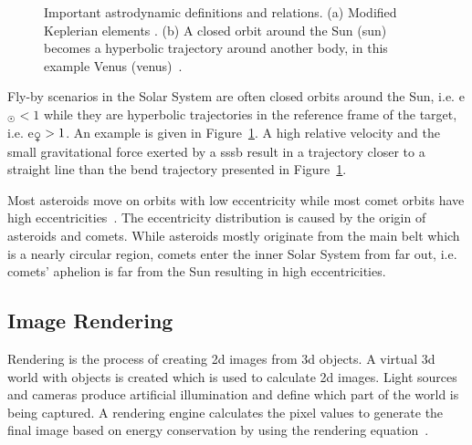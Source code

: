 \begin{figure}[htb]
\begin{subfigure}[b]{0.47\textwidth}
        \caption{}
        \label{fig:hyperbolic_orbit}
    \end{subfigure}
    \label{fig:astrodynamics}
    \caption{Important astrodynamic definitions and relations. (a) Modified Keplerian elements \cite{Commons2019Orbit}. (b) A closed orbit around the Sun (\gls{sun}) becomes a hyperbolic trajectory around another body, in this example Venus (\gls{venus})~\cite{Hintz2015FundamentalsAstrodynamics}.}
\end{figure}

Fly-by scenarios in the Solar System are often closed orbits around the Sun, i.e. \gls{e}$_{\astrosun} < 1$ while they are hyperbolic trajectories in the reference frame of the target, i.e. \gls{e}$_{\venus} > 1$. An example is given in Figure~\ref{fig:hyperbolic_orbit}. A high relative velocity and the small gravitational force exerted by a \gls{sssb} result in a trajectory closer to a straight line than the bend trajectory presented in Figure~\ref{fig:hyperbolic_orbit}. 

Most asteroids move on orbits with low eccentricity while most comet orbits have high eccentricities~\cite{ChamberlinCometDistribution}. The eccentricity distribution is caused by the origin of asteroids and comets. While asteroids mostly originate from the main belt which is a nearly circular region, comets enter the inner Solar System from far out, i.e. comets' aphelion is far from the Sun resulting in high eccentricities.

\subsection{Image Rendering}
Rendering is the process of creating \gls{2d} images from \gls{3d} objects. A virtual \gls{3d} world with objects is created which is used to calculate \gls{2d} images. Light sources and cameras produce artificial illumination and define which part of the world is being captured. A rendering engine calculates the pixel values to generate the final image based on energy conservation by using the rendering equation~\cite{Kajiya1986TheEquation}.

